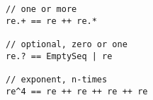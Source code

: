 \begin{lstlisting}[style=scalaioScala]
// one or more
re.+ == re ++ re.*

// optional, zero or one
re.? == EmptySeq | re

// exponent, n-times
re^4 == re ++ re ++ re ++ re
\end{lstlisting}
